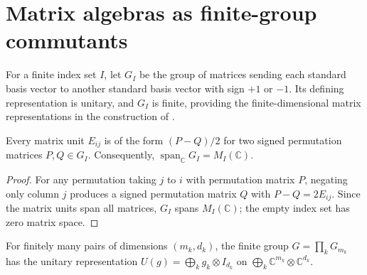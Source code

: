 \section{Matrix algebras as finite-group commutants}
\label{sec:monomial_commutants}

\begin{definition}%
    \label{def:peps_signed_permutation_representation}
    \leanok
    For a finite index set $I$, let $G_I$ be the group of matrices sending
    each standard basis vector to another standard basis vector with sign
    $+1$ or $-1$. Its defining representation is unitary, and $G_I$ is finite,
    providing the finite-dimensional matrix representations in the construction
    of \cite[Theorem~4.1]{Schuch2010PEPS}.
\end{definition}

\begin{lemma}%
    \label{thm:peps_signed_permutation_span}
    \leanok
    Every matrix unit $E_{ij}$ is of the form $(P-Q)/2$ for two signed
    permutation matrices $P,Q\in G_I$. Consequently,
    $\operatorname{span}_{\mathbb C}G_I=M_I(\mathbb C)$.
\end{lemma}

\begin{proof}\leanok
    For any permutation taking $j$ to $i$ with permutation matrix $P$,
    negating only column $j$ produces a signed permutation matrix $Q$ with
    $P-Q=2E_{ij}$. Since the matrix units span all matrices, $G_I$ spans
    $M_I(\mathbb C)$; the empty index set has zero matrix space.
\end{proof}

\begin{definition}%
    \label{def:peps_block_signed_permutation_representation}
    \leanok
    For finitely many pairs of dimensions $(m_k,d_k)$, the finite group
    $G=\prod_kG_{m_k}$ has the unitary representation
    $U(g)=\bigoplus_k g_k\otimes I_{d_k}$ on
    $\bigoplus_k\mathbb C^{m_k}\otimes\mathbb C^{d_k}$.
\end{definition}


